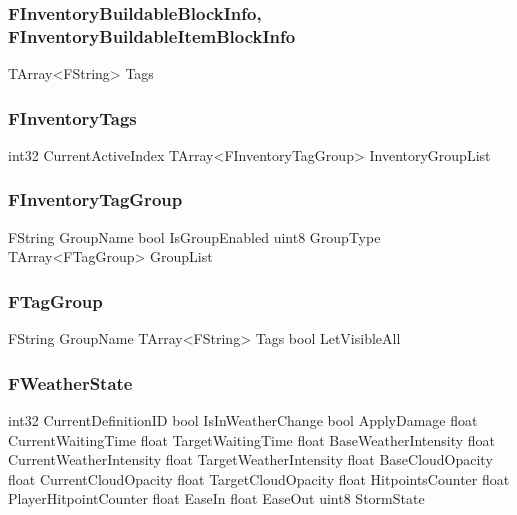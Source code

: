 \subsubsection{FInventoryBuildableBlockInfo, FInventoryBuildableItemBlockInfo}
\begin{code}
TArray<FString>                             Tags
\end{code}

\newpage


\subsubsection{FInventoryTags}
\begin{code}
int32                                       CurrentActiveIndex
TArray<FInventoryTagGroup>                  InventoryGroupList
\end{code}

\subsubsection{FInventoryTagGroup}
\begin{code}
FString                                     GroupName
bool                                        IsGroupEnabled
uint8                                       GroupType
TArray<FTagGroup>                           GroupList
\end{code}

\subsubsection{FTagGroup}
\begin{code}
FString                                     GroupName
TArray<FString>                             Tags
bool                                        LetVisibleAll
\end{code}

\subsubsection{FWeatherState}
\begin{code}
int32                                       CurrentDefinitionID
bool                                        IsInWeatherChange
bool                                        ApplyDamage
float                                       CurrentWaitingTime
float                                       TargetWaitingTime
float                                       BaseWeatherIntensity
float                                       CurrentWeatherIntensity
float                                       TargetWeatherIntensity
float                                       BaseCloudOpacity
float                                       CurrentCloudOpacity
float                                       TargetCloudOpacity
float                                       HitpointsCounter
float                                       PlayerHitpointCounter
float                                       EaseIn
float                                       EaseOut
uint8                                       StormState
\end{code}
